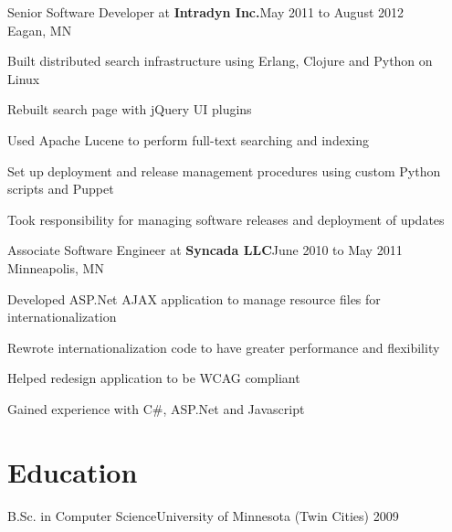 \documentclass[letterpaper]{article}
\newenvironment{resume-list}
{\begin{itemize}
 \setlength{\itemsep}{0pt}
 \setlength{\parskip}{0pt}}
{\end{itemize}}
\begin{document}
\noindent Senior Software Developer at {\bfseries Intradyn Inc.}\dotfill May 2011 to August 2012\\
Eagan, MN
\begin{resume-list}
\item Built distributed search infrastructure using Erlang, Clojure and Python on Linux
\item Rebuilt search page with jQuery UI plugins
\item Used Apache Lucene to perform full-text searching and indexing
\item Set up deployment and release management procedures using custom Python scripts and Puppet
\item Took responsibility for managing software releases and deployment of updates
\end{resume-list}
\noindent Associate Software Engineer at {\bfseries Syncada LLC}\dotfill June 2010 to May 2011\\
Minneapolis, MN
\begin{resume-list}
\item Developed ASP.Net AJAX application to manage resource files for internationalization
\item Rewrote internationalization code to have greater performance and flexibility
\item Helped redesign application to be WCAG compliant
\item Gained experience with C\#, ASP.Net and Javascript
\end{resume-list}
\section*{Education}
\noindent B.Sc. in Computer Science\dotfill University of Minnesota (Twin Cities) 2009\\
\end{document}
